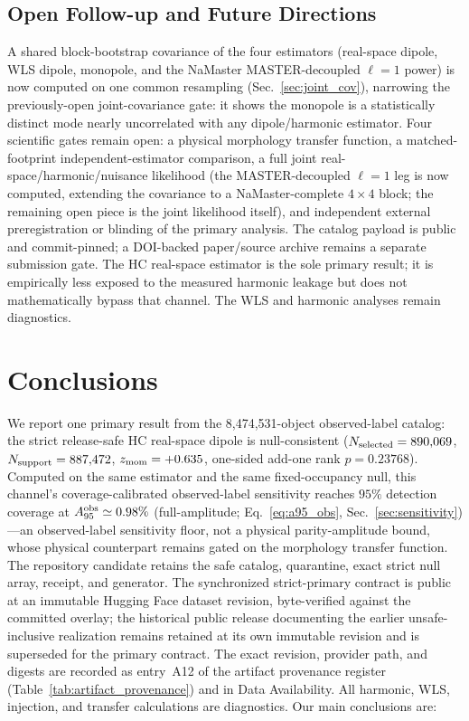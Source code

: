 \documentclass[twocolumn,linenumbers]{aastex702}
\begin{document}
\subsection{Open Follow-up and Future Directions}

A shared block-bootstrap covariance of the four estimators (real-space dipole, WLS dipole, monopole, and the NaMaster MASTER-decoupled $\ell=1$ power) is now computed on one common resampling (Sec.~\ref{sec:joint_cov}), narrowing the previously-open joint-covariance gate: it shows the monopole is a statistically distinct mode nearly uncorrelated with any dipole/harmonic estimator. Four scientific gates remain open: a physical morphology transfer function, a matched-footprint independent-estimator comparison, a full joint real-space/harmonic/nuisance likelihood (the MASTER-decoupled $\ell=1$ leg is now computed, extending the covariance to a NaMaster-complete $4\times4$ block; the remaining open piece is the joint likelihood itself), and independent external preregistration or blinding of the primary analysis. The catalog payload is public and commit-pinned; a DOI-backed paper/source archive remains a separate submission gate. The HC real-space estimator is the sole primary result; it is empirically less exposed to the measured harmonic leakage but does not mathematically bypass that channel. The WLS and harmonic analyses remain diagnostics.

\section{Conclusions}
\label{sec:conclusions}

We report one primary result from the 8,474,531-object observed-label catalog: the strict release-safe HC real-space dipole is null-consistent ($N_{\rm selected}=890{,}069$, $N_{\rm support}=887{,}472$, $z_{\rm mom}=+0.635$, one-sided add-one rank $p=0.23768$). Computed on the same estimator and the same fixed-occupancy null, this channel's coverage-calibrated observed-label sensitivity reaches $95\%$ detection coverage at $A_{95}^{\rm obs}\simeq0.98\%$ (full-amplitude; Eq.~\ref{eq:a95_obs}, Sec.~\ref{sec:sensitivity})---an observed-label sensitivity floor, not a physical parity-amplitude bound, whose physical counterpart remains gated on the morphology transfer function. The repository candidate retains the safe catalog, quarantine, exact strict null array, receipt, and generator. The synchronized strict-primary contract is public at an immutable Hugging Face dataset revision, byte-verified against the committed overlay; the historical public release documenting the earlier unsafe-inclusive realization remains retained at its own immutable revision and is superseded for the primary contract. The exact revision, provider path, and digests are recorded as entry~A12 of the artifact provenance register (Table~\ref{tab:artifact_provenance}) and in Data Availability. All harmonic, WLS, injection, and transfer calculations are diagnostics. Our main conclusions are:
\end{document}

